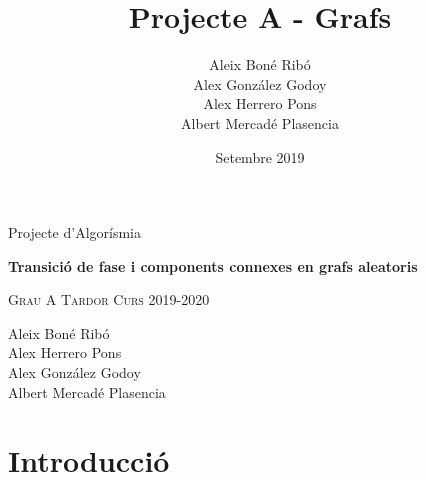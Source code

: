


\usepackage[htt]{hyphenat}
\usepackage{xspace}

\newcommand{\BRG}{\texttt{BRG}\xspace}
\newcommand{\RGG}{\texttt{RGG}\xspace}



%

\title{Projecte A - Grafs}
\author{
Aleix Boné Ribó\\
Alex González Godoy\\
Alex Herrero Pons\\
Albert Mercadé Plasencia\\
}
\date{Setembre 2019}



\thispagestyle{empty}
\clearpage
\setcounter{page}{-1}

\begin{titlepage}
{
    \centering
    \null
    \vfill
    {\Large Projecte d'Algorísmia\par}
    \vspace{2em}
    {\Huge \bfseries 
    Transició de fase i components connexes en grafs aleatoris
    \par}
    \vspace{2em}
    {\large \scshape 
    Grau A \qquad Tardor Curs 2019-2020
    \par}
    \vfill
\begin{center}
    
\end{center}
    \vspace{3cm}

    \vfill
    {\raggedleft \large
Aleix Boné Ribó\\
Alex Herrero Pons\\
Alex González Godoy\\
Albert Mercadé Plasencia\\
        \par}
}
\end{titlepage}

\pagebreak
{} 

\tableofcontents
\pagebreak
{} 

\section{Introducció}

